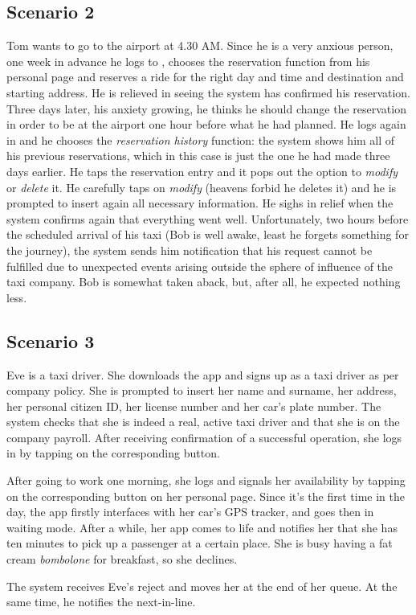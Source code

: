 \subsection{Scenario 2}
Tom wants to go to the airport at 4.30 AM. Since he is a very anxious person, one week in advance he logs to \mts{}, chooses the reservation function from his personal page and reserves a ride for the right day and time and destination and starting address. He is relieved in seeing the system has confirmed his reservation.
Three days later, his anxiety growing, he thinks he should change the reservation in order to be at the airport one hour before what he had planned. He logs again in \mts{} and he chooses the \emph{reservation history} function: the system shows him all of his previous reservations, which in this case is just the one he had made three days earlier. He taps the reservation entry and it pops out the option to \emph{modify} or \emph{delete} it. He carefully taps on \emph{modify} (heavens forbid he deletes it) and he is prompted to insert again all necessary information. He sighs in relief when the system confirms again that everything went well.
Unfortunately, two hours before the scheduled arrival of his taxi (Bob is well awake, least he forgets something for the journey), the system sends him notification that his request cannot be fulfilled due to unexpected events arising outside the sphere of influence of the taxi company. Bob is somewhat taken aback, but, after all, he expected nothing less.

\subsection{Scenario 3}
Eve is a taxi driver. She downloads the \mts{} app and signs up as a taxi driver as per company policy. She is prompted to insert her name and surname, her address, her personal citizen ID, her license number and her car’s plate number. The system checks that she is indeed a real, active taxi driver and that she is on the company payroll. After receiving confirmation of a successful operation, she logs in by tapping on the corresponding button.

After going to work one morning, she logs and signals her availability by tapping on the corresponding button on her personal page. Since it’s the first time in the day, the app firstly interfaces with her car’s GPS tracker, and goes then in waiting mode. After a while, her app comes to life and notifies her that she has ten minutes to pick up a passenger at a certain place. She is busy having a fat cream \emph{bombolone} for breakfast, so she declines.

The system receives Eve’s reject and moves her at the end of her queue. At the same time, he notifies the next-in-line.